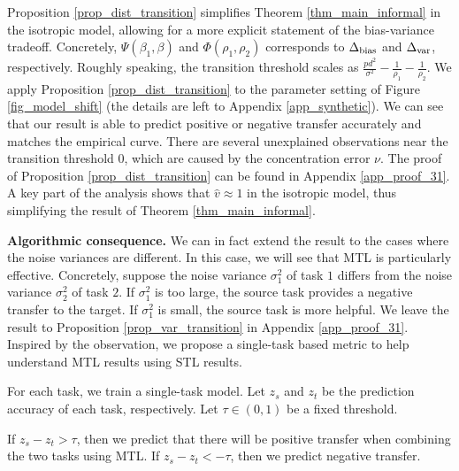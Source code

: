 Proposition \ref{prop_dist_transition} simplifies Theorem \ref{thm_main_informal} in the isotropic model, allowing for a more explicit statement of the bias-variance tradeoff.
Concretely, $\Psi(\beta_1, \beta)$ and $\Phi(\rho_1, \rho_2)$ corresponds to $\Delta_{\text{bias}}$ and $\Delta_{\text{var}}$, respectively.
Roughly speaking, the transition threshold scales as $\frac{pd^2}{\sigma^2} - \frac{1}{\rho_1} - \frac{1}{\rho_2}$.
We apply Proposition \ref{prop_dist_transition} to the parameter setting of Figure \ref{fig_model_shift} (the details are left to Appendix \ref{app_synthetic}).
We can see that our result is able to predict positive or negative transfer  accurately and matches the empirical curve.
There are several unexplained observations near the transition threshold $0$, which are caused by the concentration error $\nu$.
The proof of Proposition \ref{prop_dist_transition} can be found in Appendix \ref{app_proof_31}.
A key part of the analysis shows that $\hat{v}\approx 1$ in the isotropic model,
thus simplifying the result of Theorem \ref{thm_main_informal}.


\textbf{Algorithmic consequence.}
We can in fact extend the result to the cases where the noise variances are different.
In this case, we will see that MTL is particularly effective.
Concretely, suppose the noise variance $\sigma_1^2$ of task $1$ differs from the noise variance $\sigma_2^2$ of task $2$.
If $\sigma_1^2$ is too large, the source task provides a negative transfer to the target.
If $\sigma_1^2$ is small, the source task is more helpful.
We leave the result to Proposition \ref{prop_var_transition} in Appendix \ref{app_proof_31}.
Inspired by the observation, we propose a single-task based metric to help understand MTL results using STL results.
\squishlist
	\item For each task, we train a single-task model.
	Let $z_s$ and $z_t$ be the prediction accuracy of each task, respectively.
	Let $\tau\in(0, 1)$ be a fixed threshold.
	\item If $z_s - z_t > \tau$, then we predict that there will be positive transfer when combining the two tasks using MTL.
	If $z_s - z_t < -\tau$, then we predict negative transfer.
\squishend

